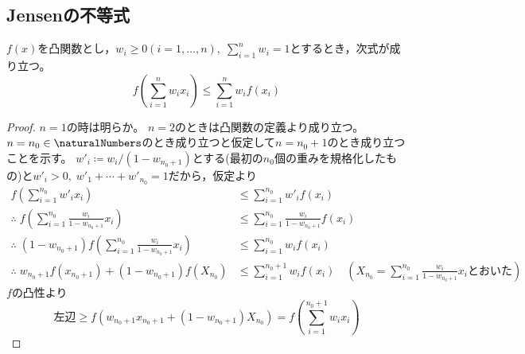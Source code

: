         \subsection{Jensenの不等式}
            \begin{shadebox}
                $f(x)$を凸関数とし，$w_i\geq 0(i=1,\dotsc,n),\;\sum_{i=1}^n w_i=1$とするとき，次式が成り立つ。
                \[ f\left(\sum_{i=1}^n w_i x_i\right) \leq \sum_{i=1}^n w_i f(x_i) \]
            \end{shadebox}
            \begin{proof}
                \quad\par
                $n=1$の時は明らか。
                $n=2$のときは凸関数の定義より成り立つ。
                $n=n_0\in\naturalNumbers$のとき成り立つと仮定して$n=n_0+1$のとき成り立つことを示す。
                $w'_i\coloneq w_i/(1-w_{n_0+1})$とする(最初の$n_0$個の重みを規格化したもの)と$w'_i>0,\;w'_1+\dotsb+w'_{n_0}=1$だから，仮定より
                \begin{align*}
                    f\left(\sum_{i=1}^{n_0}w'_i x_i\right) &\leq \sum_{i=1}^{n_0}w'_i f(x_i) \\
                    \therefore\; f\left(\sum_{i=1}^{n_0}\frac{w_i}{1-w_{n_0+1}} x_i\right) &\leq \sum_{i=1}^{n_0}\frac{w_i}{1-w_{n_0+1}} f(x_i) \\
                    \therefore\; (1-w_{n_0+1})f\left(\sum_{i=1}^{n_0}\frac{w_i}{1-w_{n_0+1}} x_i\right) &\leq \sum_{i=1}^{n_0} w_i f(x_i) \\
                    \therefore\; w_{n_0+1}f(x_{n_0+1}) + (1-w_{n_0+1})f\left(X_{n_0}\right) &\leq \sum_{i=1}^{n_0+1} w_i f(x_i) \quad \left(X_{n_0} = \sum_{i=1}^{n_0}\frac{w_i}{1-w_{n_0+1}} x_i \text{とおいた}\right)
                \end{align*}
                $f$の凸性より
                \[ \text{左辺} \geq f(w_{n_0+1}x_{n_0+1} + (1-w_{n_0+1})X_{n_0}) = f\left(\sum_{i=1}^{n_0+1}w_i x_i\right)\]
            \end{proof}
